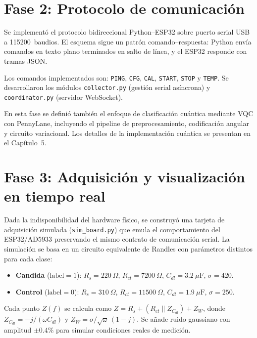 \documentclass[11pt,a4paper,spanish]{book}
\begin{document}
\section{Fase 2: Protocolo de comunicaci\'{o}n}

Se implement\'{o} el protocolo bidireccional Python--ESP32 sobre puerto serial USB a 115200~baudios. El esquema sigue un patr\'{o}n comando--respuesta: Python env\'{i}a comandos en texto plano terminados en salto de l\'{i}nea, y el ESP32 responde con tramas JSON.

Los comandos implementados son: \texttt{PING}, \texttt{CFG}, \texttt{CAL}, \texttt{START}, \texttt{STOP} y \texttt{TEMP}. Se desarrollaron los m\'{o}dulos \texttt{collector.py} (gesti\'{o}n serial as\'{i}ncrona) y \texttt{coordinator.py} (servidor WebSocket).

En esta fase se defini\'{o} tambi\'{e}n el enfoque de clasificaci\'{o}n cu\'{a}ntica mediante VQC con PennyLane, incluyendo el pipeline de preprocesamiento, codificaci\'{o}n angular y circuito variacional. Los detalles de la implementaci\'{o}n cu\'{a}ntica se presentan en el Cap\'{i}tulo~5.

\section{Fase 3: Adquisici\'{o}n y visualizaci\'{o}n en tiempo real}

Dada la indisponibilidad del hardware f\'{i}sico, se construy\'{o} una tarjeta de adquisici\'{o}n simulada (\texttt{sim\_board.py}) que emula el comportamiento del ESP32/AD5933 preservando el mismo contrato de comunicaci\'{o}n serial. La simulaci\'{o}n se basa en un circuito equivalente de Randles con par\'{a}metros distintos para cada clase:

\begin{itemize}
	\item \textbf{Candida} ($\text{label}=1$): $R_s = 220~\Omega$, $R_{ct} = 7200~\Omega$, $C_{dl} = 3.2~\mu\text{F}$, $\sigma = 420$.
	\item \textbf{Control} ($\text{label}=0$): $R_s = 310~\Omega$, $R_{ct} = 11500~\Omega$, $C_{dl} = 1.9~\mu\text{F}$, $\sigma = 250$.
\end{itemize}

Cada punto $Z(f)$ se calcula como $Z = R_s + (R_{ct} \parallel Z_{C_{dl}}) + Z_W$, donde $Z_{C_{dl}} = -j/(\omega C_{dl})$ y $Z_W = \sigma/\sqrt{\omega}\,(1-j)$. Se a\~{n}ade ruido gaussiano con amplitud $\pm 0.4\%$ para simular condiciones reales de medici\'{o}n.
\end{document}
